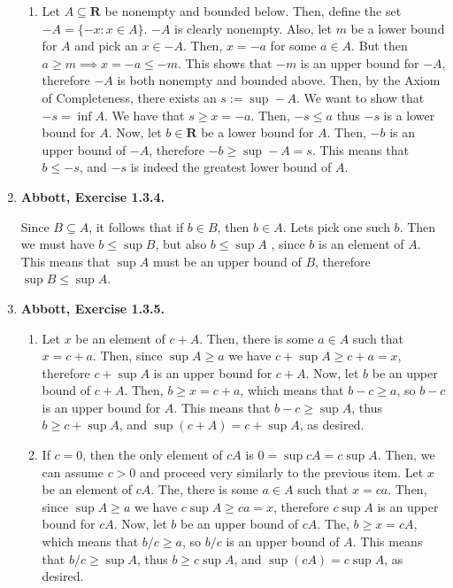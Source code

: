 \documentclass{article}
\newcommand{\R}{\mathbf{R}}
\newcommand{\exc}[2][Abbott]{\item \textbf{#1, Exercise #2.}}
\begin{document}
\begin{enumerate}
\begin{enumerate}
		\item Let $A \subseteq \R$ be nonempty and bounded below. Then, define the set $-A = \{-x: x \in A\}$. $-A$ is clearly nonempty. Also, let $m$ be a lower bound for $A$ and pick an $x \in -A$. Then, $x = -a$ for some $a \in A$. But then $a \geq m \implies x=-a \leq -m$. This shows that $-m$ is an upper bound for $-A$, therefore $-A$ is both nonempty and bounded above. Then, by the Axiom of Completeness, there exists an $s := \sup -A$. We want to show that $-s = \inf A$. We have that $s \geq x = -a$. Then, $-s \leq a$ thus $-s$ is a lower bound for $A$. Now, let $b \in \R$ be a lower bound for $A$. Then, $-b$ is an upper bound of $-A$, therefore $-b \geq \sup -A = s$. This means that $b \leq -s$, and $-s$ is indeed the greatest lower bound of $A$.
	\end{enumerate}
				      	      
	\exc{1.3.4}
				      	      
	Since $B \subseteq A$, it follows that if $b \in B$, then $b \in A$. Lets pick one such $b$. Then we must have $b \leq \sup B$, but also $b \leq \sup A$
	, since $b$ is an element of $A$. This means that $\sup A$ must be an upper bound of $B$, therefore $\sup B \leq \sup A$.
				      	      
	\exc{1.3.5}
				      	      
	\begin{enumerate}
		\item Let $x$ be an element of $c + A$. Then, there is some $a \in A$ such that $x = c + a$. Then, since $\sup A \geq a$ we have $c + \sup A \geq c + a = x$, therefore $c + \sup A$ is an upper bound for $c + A$. Now, let $b$ be an upper bound of $c + A$. Then, $b \geq x = c+a$, which means that $b - c \geq a$, so $b-c$ is an upper bound for $A$. This means that $b-c \geq \sup A$, thus $b \geq c + \sup A$, and $\sup (c+A) = c + \sup A$, as desired.
		      		      		      	      	      	      	          
		\item If $c = 0$, then the only element of $c A$ is $0 = \sup c A = c \sup A$. Then, we can assume $c > 0$ and proceed very similarly to the previous item. Let $x$ be an element of $c A$. The, there is some $a \in A$ such that $x = c a$. Then, since $\sup A \geq a$ we have $c \sup A \geq c a = x$, therefore $c \sup A$ is an upper bound for $c A$. Now, let $b$ be an upper bound of $c A$. The, $b \geq x = c A$, which means that $b/c \geq a$, so $b/c$ is an upper bound of $A$. This means that $b/c \geq \sup A$, thus $b \geq c \sup A$, and $\sup (c A) = c \sup A$, as desired.
		      		      		      	      	      	      	          

\end{enumerate}
\end{enumerate}
\end{document}

